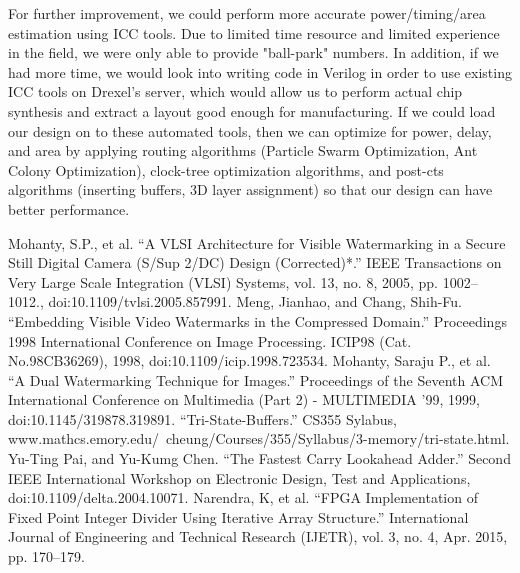 \documentclass[letterpaper, 11pt]{article}
\begin{document}
	For further improvement, we could perform more accurate power/timing/area estimation using ICC tools. Due to limited time resource and limited experience in the field, we were only able to provide "ball-park" numbers. In addition, if we had more time, we would look into writing code in Verilog in order to use existing ICC tools on Drexel's server, which would allow us to perform actual chip synthesis and extract a layout good enough for manufacturing. If we could load our design on to these automated tools, then we can optimize for power, delay, and area by applying routing algorithms (Particle Swarm Optimization, Ant Colony Optimization), clock-tree optimization algorithms, and post-cts algorithms (inserting buffers, 3D layer assignment) so that our design can have better performance. 
	
	\newpage
	\begin{thebibliography}{9}
		Mohanty, S.P., et al. “A VLSI Architecture for Visible Watermarking in a Secure Still Digital Camera (S/Sup 2/DC) Design (Corrected)*.” IEEE Transactions on Very Large Scale Integration (VLSI) Systems, vol. 13, no. 8, 2005, pp. 1002–1012., doi:10.1109/tvlsi.2005.857991.
		Meng, Jianhao, and Chang, Shih-Fu. “Embedding Visible Video Watermarks in the Compressed Domain.” Proceedings 1998 International Conference on Image Processing. ICIP98 (Cat. No.98CB36269), 1998, doi:10.1109/icip.1998.723534.
		Mohanty, Saraju P., et al. “A Dual Watermarking Technique for Images.” Proceedings of the Seventh ACM International Conference on Multimedia (Part 2)  - MULTIMEDIA '99, 1999, doi:10.1145/319878.319891.
		“Tri-State-Buffers.” CS355 Sylabus, www.mathcs.emory.edu/~cheung/Courses/355/Syllabus/3-memory/tri-state.html. 
		Yu-Ting Pai, and Yu-Kumg Chen. “The Fastest Carry Lookahead Adder.” Second IEEE International Workshop on Electronic Design, Test and Applications, doi:10.1109/delta.2004.10071. 
		Narendra, K, et al. “FPGA Implementation of Fixed Point Integer Divider Using Iterative Array Structure.” International Journal of Engineering and Technical Research (IJETR), vol. 3, no. 4, Apr. 2015, pp. 170–179. 
		
	\end{thebibliography}
	
\end{document}
